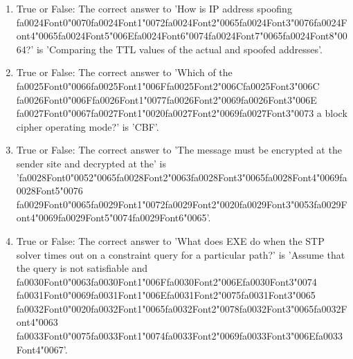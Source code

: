 \documentclass[12pt]{article}
\begin{document}
\begin{enumerate}[label=\arabic*.]
\item True or False: The correct answer to 'How is IP address spoofing {\csname fa0024Font0\endcsname\char"0070}{\csname fa0024Font1\endcsname\char"0072}{\csname fa0024Font2\endcsname\char"0065}{\csname fa0024Font3\endcsname\char"0076}{\csname fa0024Font4\endcsname\char"0065}{\csname fa0024Font5\endcsname\char"006E}{\csname fa0024Font6\endcsname\char"0074}{\csname fa0024Font7\endcsname\char"0065}{\csname fa0024Font8\endcsname\char"0064}?' is 'Comparing the TTL values of the actual and spoofed addresses'.
\item True or False: The correct answer to 'Which of the {\csname fa0025Font0\endcsname\char"0066}{\csname fa0025Font1\endcsname\char"006F}{\csname fa0025Font2\endcsname\char"006C}{\csname fa0025Font3\endcsname\char"006C} {\csname fa0026Font0\endcsname\char"006F}{\csname fa0026Font1\endcsname\char"0077}{\csname fa0026Font2\endcsname\char"0069}{\csname fa0026Font3\endcsname\char"006E} {\csname fa0027Font0\endcsname\char"0067}{\csname fa0027Font1\endcsname\char"0020}{\csname fa0027Font2\endcsname\char"0069}{\csname fa0027Font3\endcsname\char"0073} a block cipher operating mode?' is 'CBF'.
\item True or False: The correct answer to 'The message must be encrypted at the sender site and decrypted at the' is '{\csname fa0028Font0\endcsname\char"0052}{\char"0065}{\csname fa0028Font2\endcsname\char"0063}{\csname fa0028Font3\endcsname\char"0065}{\csname fa0028Font4\endcsname\char"0069}{\csname fa0028Font5\endcsname\char"0076} {\csname fa0029Font0\endcsname\char"0065}{\csname fa0029Font1\endcsname\char"0072}{\csname fa0029Font2\endcsname\char"0020}{\csname fa0029Font3\endcsname\char"0053}{\csname fa0029Font4\endcsname\char"0069}{\csname fa0029Font5\endcsname\char"0074}{\csname fa0029Font6\endcsname\char"0065}'.
\item True or False: The correct answer to 'What does EXE do when the STP solver times out on a constraint query for a particular path?' is 'Assume that the query is not satisfiable and {\csname fa0030Font0\endcsname\char"0063}{\csname fa0030Font1\endcsname\char"006F}{\csname fa0030Font2\endcsname\char"006E}{\csname fa0030Font3\endcsname\char"0074} {\csname fa0031Font0\endcsname\char"0069}{\csname fa0031Font1\endcsname\char"006E}{\csname fa0031Font2\endcsname\char"0075}{\csname fa0031Font3\endcsname\char"0065} {\csname fa0032Font0\endcsname\char"0020}{\csname fa0032Font1\endcsname\char"0065}{\csname fa0032Font2\endcsname\char"0078}{\csname fa0032Font3\endcsname\char"0065}{\csname fa0032Font4\endcsname\char"0063} {\csname fa0033Font0\endcsname\char"0075}{\csname fa0033Font1\endcsname\char"0074}{\csname fa0033Font2\endcsname\char"0069}{\csname fa0033Font3\endcsname\char"006E}{\csname fa0033Font4\endcsname\char"0067}'.
\end{enumerate}
\end{document}
